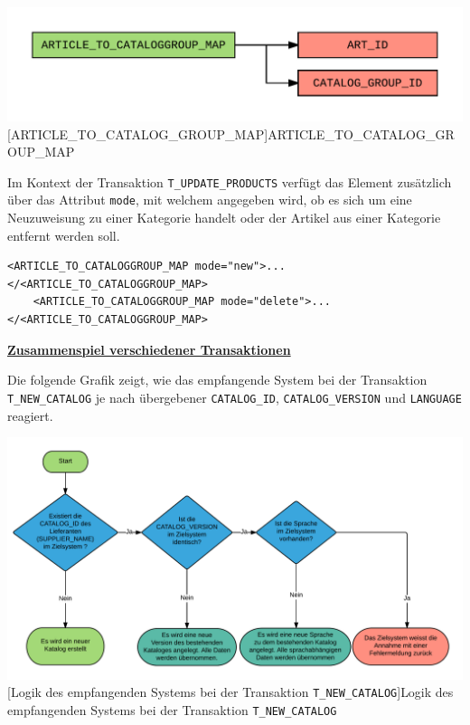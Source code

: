 	\begin{minipage}{\linewidth}
		\vspace{1em}
		\centering
		\includegraphics[width=0.7\linewidth]{img/articleGroupMap}
		[ARTICLE\_TO\_CATALOG\_GROUP\_MAP]{ARTICLE\_TO\_CATALOG\_GROUP\_MAP}
		\label{fig:header}
		\vspace{1em}
	\end{minipage}
	
	Im Kontext der Transaktion \texttt{T\_UPDATE\_PRODUCTS} verfügt das Element zusätzlich über das Attribut \texttt{mode}, mit welchem angegeben wird, ob es sich um eine Neuzuweisung zu einer Kategorie handelt oder der Artikel aus einer Kategorie entfernt werden soll.
	
	\begin{lstlisting}[caption={Modi des Elementes ARTICLE\_TO\_CATALOGGROUP\_MAP }] 
	<ARTICLE_TO_CATALOGGROUP_MAP mode="new">...</<ARTICLE_TO_CATALOGGROUP_MAP>
	<ARTICLE_TO_CATALOGGROUP_MAP mode="delete">...</<ARTICLE_TO_CATALOGGROUP_MAP>
	\end{lstlisting}
	
	\clearpage
	\textbf{\underline{Zusammenspiel verschiedener Transaktionen}}
	
	Die folgende Grafik zeigt, wie das empfangende System bei der Transaktion \texttt{T\_NEW\_CATALOG} je nach übergebener \texttt{CATALOG\_ID}, \texttt{CATALOG\_VERSION} und \texttt{LANGUAGE} reagiert.
	
	\begin{minipage}{\linewidth}
		\vspace{1em}
		\centering
		\includegraphics[width=0.8\linewidth]{img/newCatalogLogik}
		[Logik des empfangenden Systems bei der Transaktion  \texttt{T\_NEW\_CATALOG}]{Logik des empfangenden Systems bei der Transaktion  \texttt{T\_NEW\_CATALOG}}
		\label{fig:header}
		\vspace{1em}
	\end{minipage}
	
